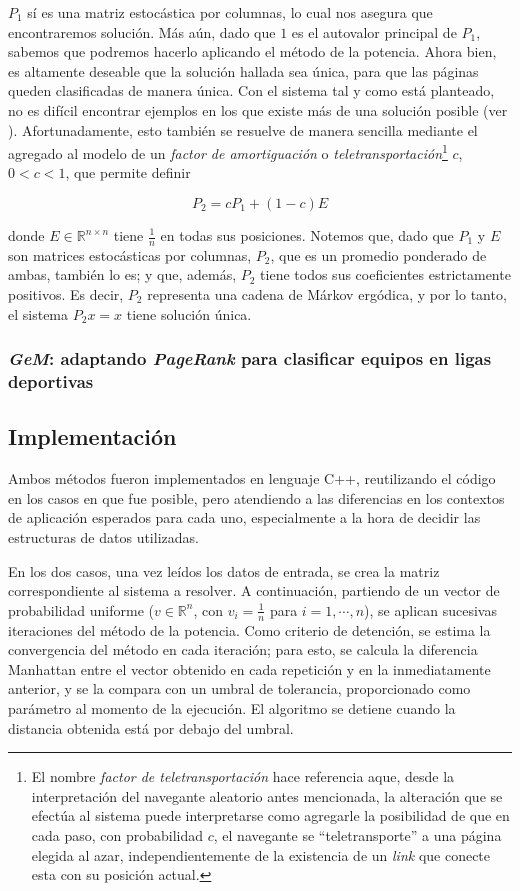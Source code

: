         $P_1$ sí es una matriz estocástica por columnas, lo cual nos asegura que encontraremos solución. Más aún, dado que $1$ es el autovalor principal de $P_1$, sabemos que podremos hacerlo aplicando el método de la potencia. Ahora bien, es altamente deseable que la solución hallada sea única, para que las páginas queden clasificadas de manera única. Con el sistema tal y como está planteado, no es difícil encontrar ejemplos en los que existe más de una solución posible (ver \cite{Bryan2006}). Afortunadamente, esto también se resuelve de manera sencilla mediante el agregado al modelo de un \emph{factor de amortiguación} o \emph{teletransportación}\footnote{El nombre \emph{factor de teletransportación} hace referencia aque, desde la interpretación del navegante aleatorio antes mencionada, la alteración que se efectúa al sistema puede interpretarse como agregarle la posibilidad de que en cada paso, con probabilidad $c$, el navegante se ``teletransporte'' a una página elegida al azar, independientemente de la existencia de un \emph{link} que conecte esta con su posición actual.} $c$, $0 < c < 1$, que permite definir

        \[ P_2 = c P_1 + (1 - c) E \]

        \noindent donde $E \in \mathbb{R}^{n \times n}$ tiene $\frac{1}{n}$ en todas sus posiciones. Notemos que, dado que $P_1$ y $E$ son matrices estocásticas por columnas, $P_2$, que es un promedio ponderado de ambas, también lo es; y que, además, $P_2$ tiene todos sus coeficientes estrictamente positivos. Es decir, $P_2$ representa una cadena de Márkov ergódica, y por lo tanto, el sistema $P_2 x = x$ tiene solución única.

        \subsubsection{\emph{GeM}: adaptando \emph{PageRank} para clasificar equipos en ligas deportivas}


    \subsection{Implementación}

    Ambos métodos fueron implementados en lenguaje C++, reutilizando el código en los casos en que fue posible, pero atendiendo a las diferencias en los contextos de aplicación esperados para cada uno, especialmente a la hora de decidir las estructuras de datos utilizadas.

    En los dos casos, una vez leídos los datos de entrada, se crea la matriz correspondiente al sistema a resolver. A continuación, partiendo de un vector de probabilidad uniforme ($v \in \mathbb{R}^n$, con $v_i = \frac{1}{n}$ para $i = 1, \cdots, n$), se aplican sucesivas iteraciones del método de la potencia. Como criterio de detención, se estima la convergencia del método en cada iteración; para esto, se calcula la diferencia Manhattan entre el vector obtenido en cada repetición y en la inmediatamente anterior, y se la compara con un umbral de tolerancia, proporcionado como parámetro al momento de la ejecución. El algoritmo se detiene cuando la distancia obtenida está por debajo del umbral.

